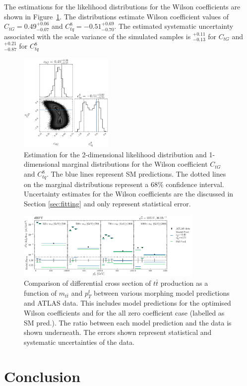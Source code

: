 \documentclass[a4paper,11pt]{article}
\begin{document}
The estimations for the likelihood distributions for the Wilson coefficients are shown in Figure~\ref{fig:corner_2D_2OP}.
The distributions estimate Wilson coefficient values of $C_{tG}=0.49_{-0.07}^{+0.06}$ and $C_{tq}^{8}=-0.51_{-0.70}^{+0.69}$.
The estimated systematic uncertainty associated with the scale variance of the simulated samples is $^{+0.11}_{-0.13}$ for $C_{tG}$ and $^{+0.21}_{-0.87}$ for $C_{tq}^{8}$


\begin{figure}[htb]
    \centering
    \includegraphics[width=0.4\textwidth]{plots/ATLAS-ctg-ctq8_2D_2OP.png}
    \caption{Estimation for the 2-dimensional likelihood distribution and 1-dimensional marginal distributions for the Wilson coefficient $C_{tG}$ and $C_{tq}^{8}$. The blue lines represent SM predictions. The dotted lines on the marginal distributions represent a 68\% confidence interval. Uncertainty estimates for the Wilson coefficients are the discussed in Section \ref{sec:fitting} and only represent statistical error.}
    \label{fig:corner_2D_2OP}
\end{figure}


\begin{figure}[htb]
    \centering
    \includegraphics[width=0.8\textwidth]{plots/ATLAS_model_result_2D_2OP.png}
    \caption{Comparison of differential cross section of $t\bar{t}$ production as a function of $m_{t\bar{t}}$ and $p_{T}^{t}$ between various morphing model predictions and ATLAS data. This includes model predictions for the optimised Wilson coefficients and for the all zero coefficient case (labelled as SM pred.). The ratio between each model prediction and the data is shown underneath. The errors shown represent statistical and systematic uncertainties of the data.}
    \label{fig:model_result_2D_2OP}
\end{figure}

\section{Conclusion}

\clearpage
\begingroup
\raggedright{}
\sloppy
\printbibliography{}
\endgroup
\end{document}
